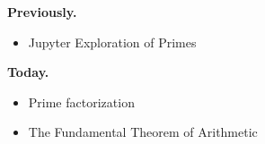 \documentclass[t]{beamer}
\subtitle{Fundamental Theorem of Arithmetic}
\begin{document}
	
\startdoc
\begin{frame}[c]{\insertframenumber}
	\begin{block}{\textbf{Previously.}}
	\begin{itemize}[label=--]
		\item Jupyter Exploration of Primes
	\end{itemize}
	\end{block}
	\begin{block}{\textbf{Today.}}
		\begin{itemize}[label=--]
			\item Prime factorization
			\item The Fundamental Theorem of Arithmetic
		\end{itemize}
	\end{block}
\end{frame}
\end{document}
